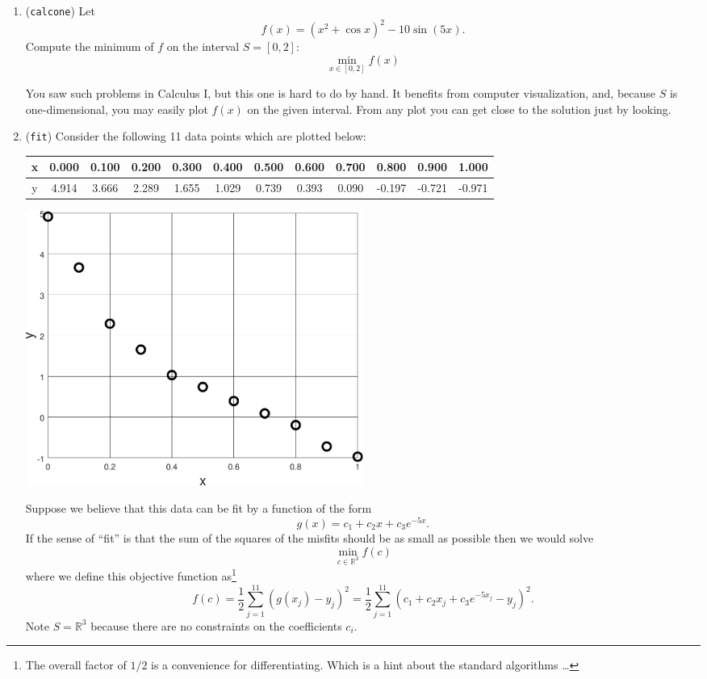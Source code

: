 \documentclass[11pt]{amsart}
\newcommand{\RR}{\mathbb{R}}
\begin{document}
\bigskip
\renewcommand{\labelenumi}{\Roman{enumi}. \quad}
\begin{enumerate}
\item (\texttt{calcone})  \quad Let
    $$f(x) = \left(x^2 + \cos x\right)^2 - 10 \sin(5 x).$$
Compute the minimum of $f$ on the interval $S=[0,2]$:
    $$\min_{x\in [0,2]} f(x)$$

You saw such problems in Calculus I, but this one is hard to do by hand.  It benefits from computer visualization, and, because $S$ is one-dimensional, you may easily plot $f(x)$ on the given interval.  From any plot you can get close to the solution just by looking.


\bigskip
\item (\texttt{fit})  \quad Consider the following 11 data points which are plotted below:

\bigskip
\begin{tabular}{c|ccccccccccc}
x & 0.000 & 0.100 & 0.200 & 0.300 & 0.400 & 0.500 & 0.600 & 0.700 &  0.800 &  0.900 &  1.000 \\
\hline
y & 4.914 & 3.666 & 2.289 & 1.655 & 1.029 & 0.739 & 0.393 & 0.090 & -0.197 & -0.721 & -0.971
\end{tabular}

\bigskip
\begin{center}
\includegraphics[width=0.5\textwidth]{fitdata}
\end{center}

\medskip
Suppose we believe that this data can be fit by a function of the form
    $$g(x) = c_1 + c_2 x + c_3 e^{-5 x}.$$
If the sense of ``fit'' is that the sum of the squares of the misfits should be as small as possible then we would solve
	$$\min_{c \in \RR^3} f(c)$$
where we define this objective function as\footnote{The overall factor of $1/2$ is a convenience for differentiating.  Which is a hint about the standard algorithms \dots} 
	$$f(c) = \frac{1}{2} \sum_{j=1}^{11} \left(g(x_j) - y_j\right)^2 = \frac{1}{2} \sum_{j=1}^{11} \left(c_1 + c_2 x_j + c_3 e^{-5 x_j} - y_j\right)^2.$$
Note $S=\RR^3$ because there are no constraints on the coefficients $c_i$.


\end{enumerate}
\end{document}
